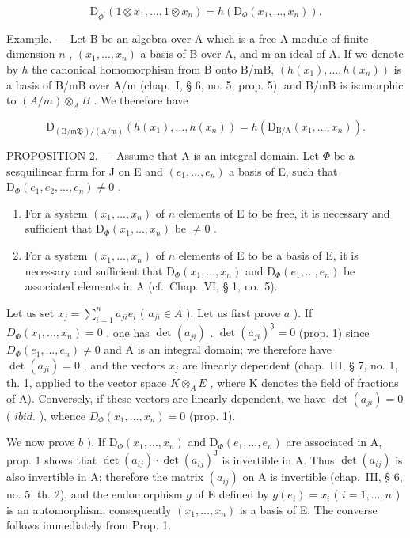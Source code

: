 \[
\mathrm{D} _ {\Phi^ {\prime}} (1 \otimes x _ {1}, \dots , 1 \otimes x _ {n}) = h (\mathrm{D} _ {\Phi} (x _ {1}, \dots , x _ {n})).\tag{6}
\]

Example. --- Let B be an algebra over A which is a free A-module of finite dimension \(n\) , \((x_{1},\ldots,x_{n})\) a basis of B over A, and m an ideal of A. If we denote by \(h\) the canonical homomorphism from B onto B/mB, \((h(x_{1}),\ldots,h(x_{n}))\) is a basis of B/mB over A/m (chap.~I, § 6, no. 5, prop. 5), and B/mB is isomorphic to \((A/m)\otimes_{A}B\) . We therefore have

\[
\mathrm{D} _ {(\mathrm{B} / \mathfrak {m B}) / (\mathrm{A} / \mathfrak {m})} (h (x _ {1}), \dots , h (x _ {n})) = h (\mathrm{D} _ {\mathrm{B} / \mathrm{A}} (x _ {1}, \dots , x _ {n})).
\]

PROPOSITION 2. --- Assume that A is an integral domain. Let \(\Phi\) be a sesquilinear form for J on E and \((e_1, \ldots, e_n)\) a basis of E, such that \(\mathrm{D}_{\Phi}(e_1, e_2, \ldots, e_n) \neq 0\) .

\begin{enumerate}
\def\labelenumi{\alph{enumi})}
\item
  For a system \((x_{1},\ldots ,x_{n})\) of \(n\) elements of E to be free, it is necessary and sufficient that \(\mathrm{D}_{\Phi}(x_1,\dots,x_n)\) be \(\neq 0\) .
\item
  For a system \((x_{1},\ldots ,x_{n})\) of \(n\) elements of E to be a basis of E, it is necessary and sufficient that \(\mathrm{D}_{\Phi}(x_1,\dots,x_n)\) and \(\mathrm{D}_{\Phi}(e_1,\dots,e_n)\) be associated elements in A (cf.~Chap.~VI, § 1, no.~5).
\end{enumerate}

Let us set \(x_j = \sum_{i=1}^{n} a_{ji} e_i\) ( \(a_{ji} \in A\) ). Let us first prove \(a\) ). If \(D_{\Phi}(x_1, \ldots, x_n) = 0\) , one has \(\det(a_{ji})\) . \(\det(a_{ji})^{\mathfrak{J}} = 0\) (prop. 1) since \(D_{\Phi}(e_1, \ldots, e_n) \neq 0\) and A is an integral domain; we therefore have \(\det(a_{ji}) = 0\) , and the vectors \(x_j\) are linearly dependent (chap.~III, § 7, no. 1, th. 1, applied to the vector space \(K \otimes_A E\) , where K denotes the field of fractions of A). Conversely, if these vectors are linearly dependent, we have \(\det(a_{ji}) = 0\) ( \(ibid.\) ), whence \(D_{\Phi}(x_1, \ldots, x_n) = 0\) (prop. 1).

We now prove \(b\) ). If \(\mathrm{D}_{\Phi}(x_1, \ldots, x_n)\) and \(\mathrm{D}_{\Phi}(e_1, \ldots, e_n)\) are associated in A, prop. 1 shows that \(\det(a_{ij}) \cdot \det(a_{ij})^{\mathrm{J}}\) is invertible in A. Thus \(\det(a_{ij})\) is also invertible in A; therefore the matrix \((a_{ij})\) on A is invertible (chap.~III, § 6, no. 5, th. 2), and the endomorphism \(g\) of E defined by \(g(e_i) = x_i\) ( \(i = 1, \ldots, n\) ) is an automorphism; consequently \((x_1, \ldots, x_n)\) is a basis of E. The converse follows immediately from Prop. 1.

